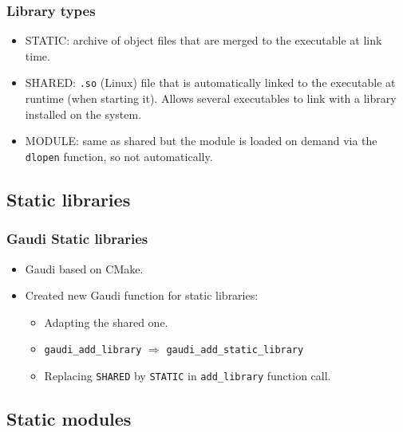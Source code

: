 \documentclass{beamer}
\begin{document}
    \begin{frame}[fragile]
        \frametitle{Library types}

        \begin{itemize}
            \item STATIC: archive of object files that are merged to the executable at link time.
            \item SHARED: \verb'.so' (Linux) file that is automatically linked to the executable at runtime (when starting it).
            Allows several executables to link with a library installed on the system.
            \item MODULE: same as shared but the module is loaded on demand via the \verb'dlopen' function, so not automatically.
        \end{itemize}
    \end{frame}

    \subsection{Static libraries}

    \begin{frame}[fragile]
        \frametitle{Gaudi Static libraries}

        \begin{itemize}
            \item Gaudi based on CMake.
            \item Created new Gaudi function for static libraries:
            \begin{itemize}
                \item Adapting the shared one.
                \item \verb'gaudi_add_library' $\Rightarrow$ \verb'gaudi_add_static_library'
                \item Replacing \verb'SHARED' by \verb'STATIC' in \verb'add_library' function call.
            \end{itemize}
        \end{itemize}
    \end{frame}

    \subsection{Static modules}
\end{document}
